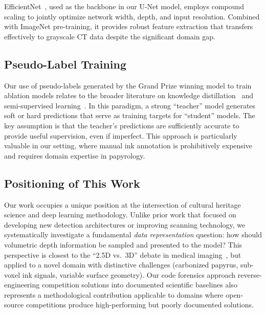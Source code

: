 EfficientNet~\cite{tan2019efficientnet}, used as the backbone in our U-Net model, employs compound scaling to jointly optimize network width, depth, and input resolution. Combined with ImageNet pre-training, it provides robust feature extraction that transfers effectively to grayscale CT data despite the significant domain gap.

\subsection{Pseudo-Label Training}

Our use of pseudo-labels generated by the Grand Prize winning model to train ablation models relates to the broader literature on knowledge distillation~\cite{hinton2015distilling} and semi-supervised learning~\cite{lee2013pseudo}. In this paradigm, a strong ``teacher'' model generates soft or hard predictions that serve as training targets for ``student'' models. The key assumption is that the teacher's predictions are sufficiently accurate to provide useful supervision, even if imperfect. This approach is particularly valuable in our setting, where manual ink annotation is prohibitively expensive and requires domain expertise in papyrology.

\subsection{Positioning of This Work}

Our work occupies a unique position at the intersection of cultural heritage science and deep learning methodology. Unlike prior work that focused on developing new detection architectures or improving scanning technology, we systematically investigate a fundamental \emph{data representation} question: how should volumetric depth information be sampled and presented to the model? This perspective is closest to the ``2.5D vs.\ 3D'' debate in medical imaging~\cite{xia2018bridging}, but applied to a novel domain with distinctive challenges (carbonized papyrus, sub-voxel ink signals, variable surface geometry). Our code forensics approach reverse-engineering competition solutions into documented scientific baselines also represents a methodological contribution applicable to domains where open-source competitions produce high-performing but poorly documented solutions.
